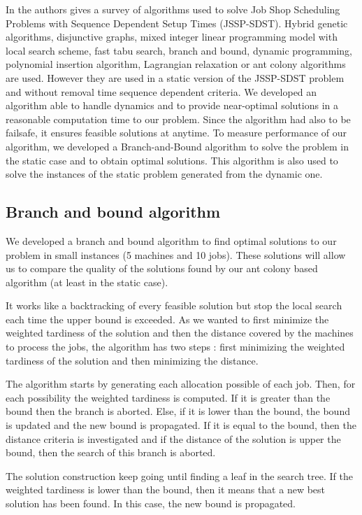 \documentclass[a4paper,10pt]{article}
\begin{document}
  In \cite{Allahverdi2008} the authors gives a survey of algorithms used to solve Job Shop Scheduling Problems with Sequence Dependent Setup Times (JSSP-SDST). Hybrid genetic algorithms, disjunctive graphs, mixed integer linear programming model with local search scheme, fast tabu search, branch and bound, dynamic programming, polynomial insertion algorithm, Lagrangian relaxation or ant colony algorithms are used. However they are used in a static version of the JSSP-SDST problem and without removal time sequence dependent criteria.
   We developed an algorithm able to handle dynamics and to provide near-optimal solutions in a reasonable computation time to our problem. Since the algorithm had also to be failsafe, it ensures feasible solutions at anytime. To measure performance of our algorithm, we developed a Branch-and-Bound algorithm to solve the problem in the static case and to obtain optimal solutions. This algorithm is also used to solve the instances of the static problem generated from the dynamic one.

  \subsection{Branch and bound algorithm}
  We developed a branch and bound algorithm to find optimal solutions to our problem in small instances (5 machines and 10 jobs). These solutions will allow us to compare the quality of the solutions found by our ant colony based algorithm (at least in the static case).

  It works like a backtracking of every feasible solution but stop the local search each time the upper bound is exceeded. As we wanted to first minimize the weighted tardiness of the solution and then the distance covered by the machines to process the jobs, the algorithm has two steps : first minimizing the weighted tardiness of the solution and then minimizing the distance.

  The algorithm starts by generating each allocation possible of each job. Then, for each possibility the weighted tardiness is computed. If it is greater than the bound then the branch is aborted. Else, if it is lower than the bound, the bound is updated and the new bound is propagated. If it is equal to the bound, then the distance criteria is investigated and if the distance of the solution is upper the bound, then the search of this branch is aborted.
  
  The solution construction keep going until finding a leaf in the search tree. If the weighted tardiness is lower than the bound, then it means that a new best solution has been found. In this case, the new bound is propagated.
\end{document}
